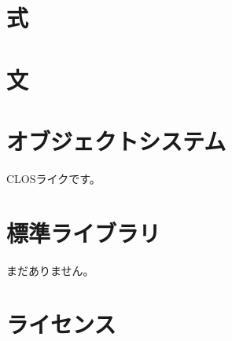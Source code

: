 \documentclass{article}
\begin{document}
\section{式}
\section{文}

\section{オブジェクトシステム}
CLOSライクです。

\section{標準ライブラリ}
まだありません。
\section{ライセンス}
\end{document}
